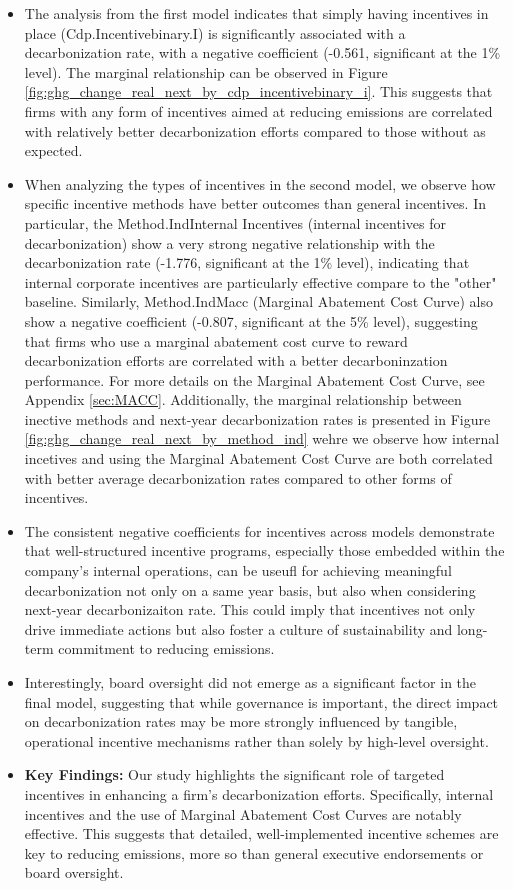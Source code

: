 \begin{itemize}
    \item The analysis from the first model indicates that simply having incentives in place (Cdp.Incentivebinary.I) is significantly associated with a decarbonization rate, with a negative coefficient (-0.561, significant at the 1\% level). The marginal relationship can be observed in Figure \ref{fig:ghg_change_real_next_by_cdp_incentivebinary_i}. This suggests that firms with any form of incentives aimed at reducing emissions are correlated with relatively better decarbonization efforts compared to those without as expected.

    \item When analyzing the types of incentives in the second model, we observe how specific incentive methods have better outcomes than general incentives. In particular, the Method.IndInternal Incentives (internal incentives for decarbonization) show a very strong negative relationship with the decarbonization rate (-1.776, significant at the 1\% level), indicating that internal corporate incentives are particularly effective compare to the "other" baseline. Similarly, Method.IndMacc (Marginal Abatement Cost Curve) also show a negative coefficient (-0.807, significant at the 5\% level), suggesting that firms who use a marginal abatement cost curve to reward decarbonization efforts are correlated with a better decarboninzation performance. For more details on the Marginal Abatement Cost Curve, see Appendix \ref{sec:MACC}. Additionally, the marginal relationship between inective methods and next-year decarbonization rates is presented in Figure \ref{fig:ghg_change_real_next_by_method_ind} wehre we observe how internal incetives and using the Marginal Abatement Cost Curve are both correlated with better average decarbonization rates compared to other forms of incentives.


    \item The consistent negative coefficients for incentives across models demonstrate that well-structured incentive programs, especially those embedded within the company's internal operations, can be useufl  for achieving meaningful decarbonization not only on a same year basis, but also when considering next-year decarbonizaiton rate. This could imply that incentives not only drive immediate actions but also foster a culture of sustainability and long-term commitment to reducing emissions.

    \item Interestingly, board oversight did not emerge as a significant factor in the final model, suggesting that while governance is important, the direct impact on decarbonization rates may be more strongly influenced by tangible, operational incentive mechanisms rather than solely by high-level oversight.
    \item \textbf{Key Findings:} Our study highlights the significant role of targeted incentives in enhancing a firm's decarbonization efforts. Specifically, internal incentives and the use of Marginal Abatement Cost Curves are notably effective. This suggests that detailed, well-implemented incentive schemes are key to reducing emissions, more so than general executive endorsements or board oversight.


\end{itemize}
